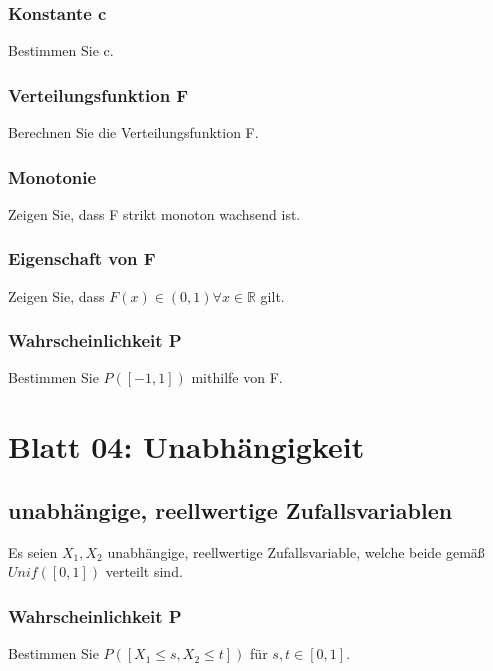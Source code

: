 \documentclass[paper=a4, fontsize=11pt]{scrartcl}
\numberwithin{equation}{section}
\numberwithin{figure}{section}
\numberwithin{table}{section}
\begin{document}
\subsubsection{Konstante c}
Bestimmen Sie c. \\

\subsubsection{Verteilungsfunktion F}
Berechnen Sie die Verteilungsfunktion F. \\

\subsubsection{Monotonie}
Zeigen Sie, dass F strikt monoton wachsend ist. \\

\subsubsection{Eigenschaft von F}
Zeigen Sie, dass $F(x) \in (0,1) \forall x \in \mathbb{R}$ gilt. \\

\subsubsection{Wahrscheinlichkeit P}
Bestimmen Sie $P([-1,1])$ mithilfe von F. \\

\section{Blatt 04: Unabhängigkeit}
\subsection{unabhängige, reellwertige Zufallsvariablen}
Es seien $X_{1}, X_{2}$ unabhängige, reellwertige Zufallsvariable, welche beide gemäß $Unif([0,1])$ verteilt sind. \\

\subsubsection{Wahrscheinlichkeit P}
Bestimmen Sie $P([X_{1} \leq s, X_{2} \leq t])$ für $s,t \in [0,1]$. \\
\end{document}
